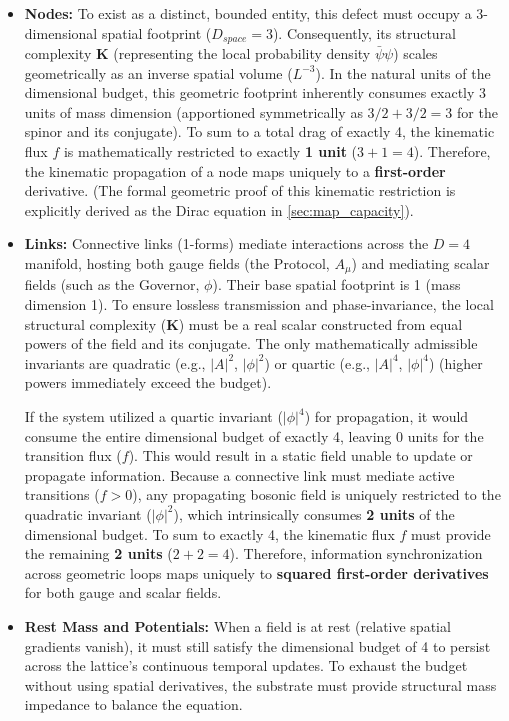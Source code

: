 \begin{itemize}
    \item \textbf{Nodes:} 
    To exist as a distinct, bounded entity, this defect must occupy a 3-dimensional spatial footprint ($D_{space} = 3$). Consequently, its structural complexity $\mathbf{K}$ (representing the local probability density $\bar{\psi}\psi$) scales geometrically as an inverse spatial volume ($L^{-3}$). In the natural units of the dimensional budget, this geometric footprint inherently consumes exactly 3 units of mass dimension (apportioned symmetrically as $3/2 + 3/2 = 3$ for the spinor and its conjugate). To sum to a total drag of exactly 4, the kinematic flux $f$ is mathematically restricted to exactly \textbf{1 unit} ($3+1=4$). Therefore, the kinematic propagation of a node maps uniquely to a \textbf{first-order} derivative. (The formal geometric proof of this kinematic restriction is explicitly derived as the Dirac equation in \cref{sec:map_capacity}).

    \item \textbf{Links:} Connective links (1-forms) mediate interactions across the $D=4$ manifold, hosting both gauge fields (the Protocol, $A_\mu$) and mediating scalar fields (such as the Governor, $\phi$). Their base spatial footprint is 1 (mass dimension 1). To ensure lossless transmission and phase-invariance, the local structural complexity ($\mathbf{K}$) must be a real scalar constructed from equal powers of the field and its conjugate. The only mathematically admissible invariants are quadratic (e.g., $|A|^2$, $|\phi|^2$) or quartic (e.g., $|A|^4$, $|\phi|^4$) (higher powers immediately exceed the budget). 
    
    If the system utilized a quartic invariant ($|\phi|^4$) for propagation, it would consume the entire dimensional budget of exactly 4, leaving 0 units for the transition flux ($f$). This would result in a static field unable to update or propagate information. Because a connective link must mediate active transitions ($f > 0$), any propagating bosonic field is uniquely restricted to the quadratic invariant ($|\phi|^2$), which intrinsically consumes \textbf{2 units} of the dimensional budget. To sum to exactly 4, the kinematic flux $f$ must provide the remaining \textbf{2 units} ($2+2=4$). Therefore, information synchronization across geometric loops maps uniquely to \textbf{squared first-order derivatives} for both gauge and scalar fields.

    \label{subsec:restmass}
    \item \textbf{Rest Mass and Potentials:} When a field is at rest (relative spatial gradients vanish), it must still satisfy the dimensional budget of 4 to persist across the lattice's continuous temporal updates. To exhaust the budget without using spatial derivatives, the substrate must provide structural mass impedance to balance the equation.
    

\end{itemize}
